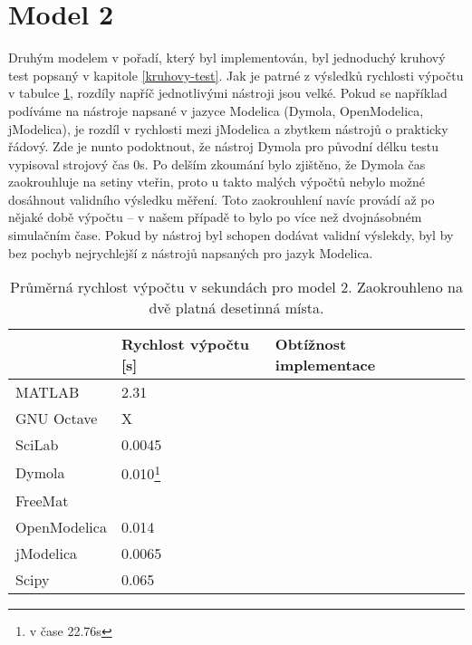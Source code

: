 \section{Model 2}
\label{srovnani-kruh}
Druhým modelem v pořadí, který byl implementován, byl jednoduchý kruhový test popsaný v kapitole \ref{kruhovy-test}. Jak je patrné z výsledků rychlosti výpočtu v tabulce \ref{tab:kruh-tabulka}, rozdíly napříč jednotlivými nástroji jsou velké. Pokud se například podíváme na nástroje napsané v jazyce Modelica (Dymola, OpenModelica, jModelica), je rozdíl v rychlosti mezi jModelica a zbytkem nástrojů o prakticky řádový. Zde je nunto podoktnout, že nástroj Dymola pro původní délku testu vypisoval strojový čas 0s. Po delším zkoumání bylo zjištěno, že Dymola čas zaokrouhluje na setiny vteřin, proto u takto malých výpočtů nebylo možné dosáhnout validního  výsledku měření. Toto zaokrouhlení navíc provádí až po nějaké době výpočtu -- v našem případě to bylo po více než dvojnásobném simulačním čase. Pokud by nástroj byl schopen dodávat validní výslekdy, byl by bez pochyb nejrychlejší z nástrojů napsaných pro jazyk Modelica.

\begin{savenotes}
\begin{table}[ht]
\centering
\begin{tabular}{|l|l|l|l|}
\hline
             & Rychlost výpočtu {[}s{]} & Obtížnost implementace &  \\ \hline
MATLAB       &         2.31                 &  &  \\ \hline
GNU Octave   &           X               &  &  \\ \hline
SciLab       &            0.0045              &  &  \\ \hline
Dymola       &           0.010\footnote{v čase 22.76s}               &  &  \\ \hline
FreeMat &                          &  &  \\ \hline
OpenModelica    &        0.014                  &  &  \\ \hline
jModelica        &       0.0065              &  &  \\ \hline
Scipy             &      0.065                    &  &  \\ \hline
\end{tabular}
\caption{Průměrná rychlost výpočtu v sekundách pro model 2. Zaokrouhleno na dvě platná desetinná místa.}
\label{tab:kruh-tabulka}
\end{table}
\end{savenotes}

